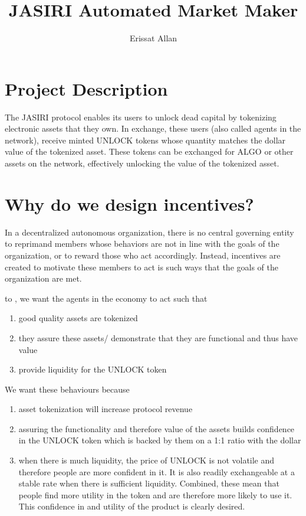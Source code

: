 \documentclass{article}
\title{JASIRI Automated Market Maker}
\author{Erissat Allan}
\date{}
\begin{document}


\section{Project Description}

The JASIRI protocol enables its users to unlock dead capital by tokenizing electronic assets that they own. In exchange, these users (also called agents in the network), receive minted UNLOCK tokens whose quantity matches the dollar value of the tokenized asset. These tokens can be exchanged for ALGO or other assets on the network, effectively unlocking the value of the tokenized asset.


\section{Why do we design incentives?}
In a decentralized autonomous organization, there is no central governing entity to reprimand members whose behaviors are not in line with the goals of the organization, or to reward those who act accordingly. Instead, incentives are created to motivate these members to act is such ways that the goals of the organization are met.

\vspace{5}
\noindent to , we want the agents in the economy to act such that
\begin{enumerate}
    \item good quality assets are tokenized
    \item they assure these assets/ demonstrate that they are functional and thus have value
    \item provide liquidity for the UNLOCK token
\end{enumerate}

\noindent We want these behaviours because
\begin{enumerate}
    \item asset tokenization will increase protocol revenue
    \item assuring the functionality and therefore value of the assets builds confidence in the UNLOCK token which is backed by them on a 1:1 ratio with the dollar
    \item when there is much liquidity, the price of UNLOCK is not volatile and therefore people are more confident in it. It is also readily exchangeable at a stable rate when there is sufficient liquidity. Combined, these mean that people find more utility in the token and are therefore more likely to use it. This confidence in and utility of the product is clearly desired.    
\end{enumerate}
\end{document}
